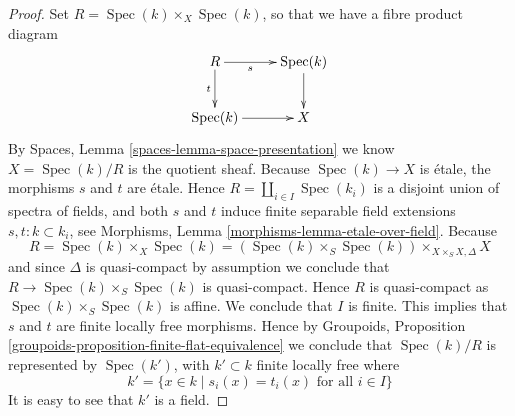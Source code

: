 \documentclass[10pt,a4paper]{amsart}
\theoremstyle{plain}
\theoremstyle{definition}
\theoremstyle{remark}
\numberwithin{equation}{subsection}
\def\Spec{\mathop{\mathrm{Spec}}}
\begin{document}
\begin{proof}
Set $R = \Spec(k) \times_X \Spec(k)$, so that we have a
fibre product diagram
$$
\xymatrix{
R \ar[r]_-s \ar[d]_-t & \Spec(k) \ar[d] \\
\Spec(k) \ar[r] & X
}
$$
By
Spaces, Lemma \ref{spaces-lemma-space-presentation}
we know $X = \Spec(k)/R$ is the quotient sheaf.
Because $\Spec(k) \to X$ is \'etale, the morphisms $s$ and $t$ are
\'etale. Hence $R = \coprod_{i \in I} \Spec(k_i)$ is a disjoint
union of spectra of fields, and both $s$ and $t$
induce finite separable field extensions $s, t : k \subset k_i$, see
Morphisms, Lemma \ref{morphisms-lemma-etale-over-field}.
Because
$$
R = \Spec(k) \times_X \Spec(k)
= (\Spec(k) \times_S \Spec(k)) \times_{X \times_S X, \Delta} X
$$
and since $\Delta$ is quasi-compact by assumption we conclude that
$R \to \Spec(k) \times_S \Spec(k)$ is quasi-compact.
Hence $R$ is quasi-compact as $\Spec(k) \times_S \Spec(k)$ is
affine. We conclude that $I$ is finite. This implies
that $s$ and $t$ are finite locally free morphisms. Hence by
Groupoids, Proposition \ref{groupoids-proposition-finite-flat-equivalence}
we conclude that $\Spec(k)/R$ is
represented by $\Spec(k')$, with $k' \subset k$ finite locally free
where
$$
k' = \{x \in k \mid s_i(x) = t_i(x)\text{ for all }i \in I\}
$$
It is easy to see that $k'$ is a field.
\end{proof}
\end{document}
